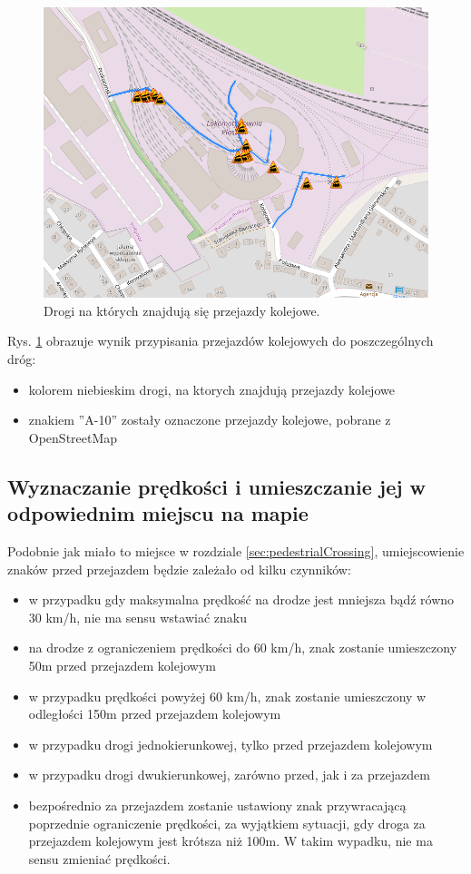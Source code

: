 \begin{figure}[h]
\caption{Drogi na których znajdują się przejazdy kolejowe.}
\label{sec:PrzejazdyKolejowe}
\centering
\includegraphics[width=1.0\textwidth]{railCrossing}
\end{figure}

Rys. \ref{sec:PrzejazdyKolejowe} obrazuje wynik przypisania przejazdów kolejowych do poszczególnych dróg:
\begin{itemize}
\item kolorem niebieskim drogi, na ktorych znajdują przejazdy kolejowe
\item znakiem ''A-10'' zostały oznaczone przejazdy kolejowe, pobrane z OpenStreetMap
\end{itemize}

\newpage
\subsection{Wyznaczanie prędkości i umieszczanie jej w odpowiednim miejscu na mapie}

Podobnie jak miało to miejsce w rozdziale \ref{sec:pedestrialCrossing}, umiejscowienie znaków przed przejazdem będzie zależało od kilku czynników:
\begin{itemize}
\item w przypadku gdy maksymalna prędkość na drodze jest mniejsza bądź równo 30 km/h, nie ma sensu wstawiać znaku
\item na  drodze z ograniczeniem prędkości do 60 km/h, znak zostanie umieszczony 50m przed przejazdem kolejowym
\item w przypadku prędkości powyżej 60 km/h, znak zostanie umieszczony w odległości 150m przed przejazdem kolejowym
\item w przypadku drogi jednokierunkowej, tylko przed przejazdem kolejowym
\item w przypadku drogi dwukierunkowej, zarówno przed, jak i za przejazdem
\item bezpośrednio za przejazdem zostanie ustawiony znak przywracającą poprzednie ograniczenie prędkości, za wyjątkiem sytuacji, gdy droga za przejazdem kolejowym jest krótsza niż 100m. W takim wypadku, nie ma sensu zmieniać prędkości.
\end{itemize}


